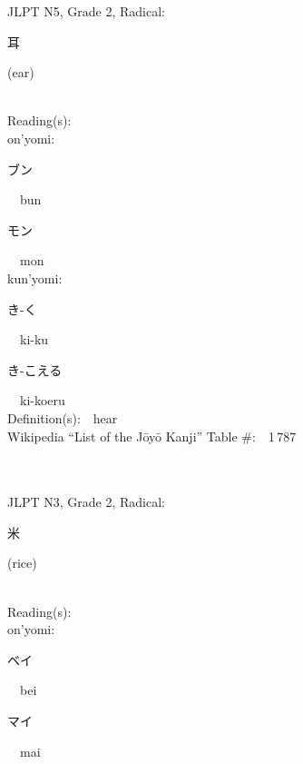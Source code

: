 \begin{multicols}{2}
{JLPT N5, Grade 2, Radical:\ \ {\begin{CJK}{UTF8}{min} 耳 \end{CJK}} (ear) } \\
Reading(s):\ \ \\
{\hspace*{1em}}on'yomi:\ \ \\
{\hspace*{2em}}{\begin{CJK}{UTF8}{min} ブン \end{CJK}}\ \ bun\ \ \\
{\hspace*{2em}}{\begin{CJK}{UTF8}{min} モン \end{CJK}}\ \ mon\ \ \\
{\hspace*{1em}}kun'yomi:\ \ \\
{\hspace*{2em}}{\begin{CJK}{UTF8}{min} き-く \end{CJK}}\ \ ki-ku\ \ \\
{\hspace*{2em}}{\begin{CJK}{UTF8}{min} き-こえる \end{CJK}}\ \ ki-koeru\ \ \\
Definition(s):\ \ hear \\
Wikipedia ``List of the J\=oy\=o Kanji'' Table \#:\ \ 1\,787 \\
\ \ \\
{\fontsize{34pt}{40pt}  }\ \ \\  %
{JLPT N3, Grade 2, Radical:\ \ {\begin{CJK}{UTF8}{min} 米 \end{CJK}} (rice) } \\
Reading(s):\ \ \\
{\hspace*{1em}}on'yomi:\ \ \\
{\hspace*{2em}}{\begin{CJK}{UTF8}{min} ベイ \end{CJK}}\ \ bei\ \ \\
{\hspace*{2em}}{\begin{CJK}{UTF8}{min} マイ \end{CJK}}\ \ mai\ \ \\

\end{multicols}
